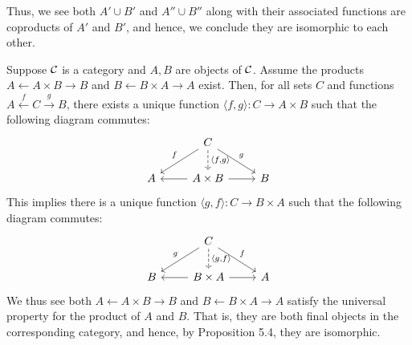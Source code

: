 \begin{xca}
Thus, we see both $A' \cup B'$ and $A'' \cup B''$ along with their associated
functions are coproducts of $A'$ and $B'$, and hence, we conclude they are
isomorphic to each other.
\end{xca}

\begin{xca}
Suppose $\mathcal{C}$ is a category and $A, B$ are objects of $\mathcal{C}$. Assume the
products $A \leftarrow A \times B \to B$ and $B \leftarrow B \times A \to A$
exist. Then, for all sets $C$ and functions $A \xleftarrow{f} C \xrightarrow{g}
B$, there exists a unique function $\langle f, g \rangle: C \to A \times B$
such that the following diagram commutes:
\[
\begin{tikzcd}
    & C \arrow[ld, swap, "f"]
        \arrow[rd, "g"]
        \arrow[d, dashed, "\langle {f, g} \rangle"] & \\
    A & A \times B \arrow[l]
                   \arrow[r]
                   & B
\end{tikzcd}
\]
This implies there is a unique function $\langle g, f \rangle: C \to B \times A$
such that the following diagram commutes:
\[
\begin{tikzcd}
    & C \arrow[ld, swap, "g"]
        \arrow[rd, "f"]
        \arrow[d, dashed, "\langle {g, f} \rangle"] & \\
    B & B \times A \arrow[l]
                   \arrow[r]
                   & A
\end{tikzcd}
\]
We thus see both $A \leftarrow A \times B \to B$ and $B \leftarrow B \times A
\to A$ satisfy the universal property for the product of $A$ and $B$. That is,
they are both final objects in the corresponding category, and hence, by
Proposition 5.4, they are isomorphic.
\end{xca}

